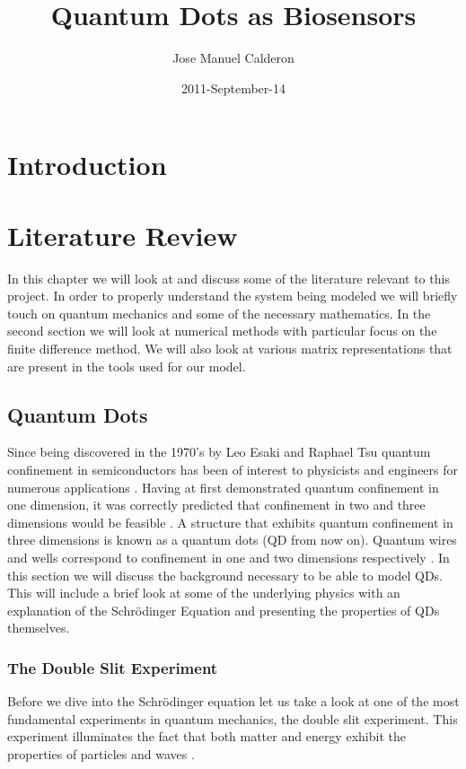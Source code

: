 \documentclass[authoryearcitations]{UoYCSproject}
\author{Jose Manuel Calderon}
\title{Quantum Dots as Biosensors}
\date{2011-September-14}
\begin{document}
 
\maketitle
\chapter{Introduction}

\chapter{Literature Review}
In this chapter we will look at and discuss some of the literature relevant to this project. 
In order to properly understand the system being modeled we will briefly touch on quantum mechanics
and some of the necessary mathematics. In the second section we will look at numerical methods with
particular focus on the finite difference method.
We will also look at various matrix representations that are present in the tools used for our
model. 
 
\section{Quantum Dots}
Since being discovered in the 1970's by Leo Esaki and 
Raphael Tsu quantum confinement in semiconductors has been of interest to physicists and engineers for numerous applications 
\cite{dots, reed}. Having at first demonstrated quantum confinement in one dimension, it was correctly predicted that 
confinement in two and three dimensions would be feasible \cite{dots}. A structure that exhibits 
quantum confinement in three dimensions is known as a quantum dots (QD from now on). Quantum wires and 
wells correspond to confinement in one and two dimensions respectively \cite{dots}. In this section we will discuss the
background necessary to be able to model QDs. This will include a brief look at some of the underlying physics with an 
explanation of the Schr\"{o}dinger Equation and 
presenting the properties of QDs themselves. 

\subsection{The Double Slit Experiment}
Before we dive into the Schr\"{o}dinger equation let us take a look at one of the most fundamental experiments in
quantum mechanics, the double slit experiment. This experiment illuminates the fact that both matter and energy 
exhibit the properties of particles and waves \cite{qp}. 
\end{document}
